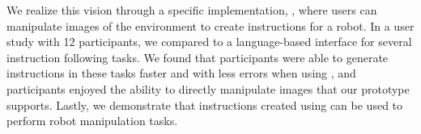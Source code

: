 We realize this vision through a specific implementation, \projname, where users can manipulate images of the environment to create instructions for a robot. In a user study with 12 participants, we compared \projname to a language-based interface for several instruction following tasks. We found that participants were able to generate instructions in these tasks faster and with less errors when using \projname, and participants enjoyed the ability to directly manipulate images that our prototype supports. Lastly, we demonstrate that instructions created using \projname can be used to perform robot manipulation tasks.






